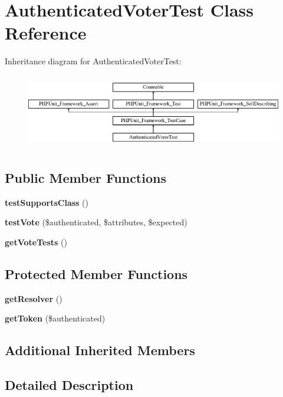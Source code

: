 \section{Authenticated\+Voter\+Test Class Reference}
\label{class_symfony_1_1_component_1_1_security_1_1_core_1_1_tests_1_1_authorization_1_1_voter_1_1_authenticated_voter_test}
Inheritance diagram for Authenticated\+Voter\+Test\+:\begin{figure}[H]
\begin{center}
\leavevmode
\includegraphics[height=3.303835cm]{class_symfony_1_1_component_1_1_security_1_1_core_1_1_tests_1_1_authorization_1_1_voter_1_1_authenticated_voter_test}
\end{center}
\end{figure}
\subsection*{Public Member Functions}
\begin{DoxyCompactItemize}
\item 
{\bf test\+Supports\+Class} ()
\item 
{\bf test\+Vote} (\$authenticated, \$attributes, \$expected)
\item 
{\bf get\+Vote\+Tests} ()
\end{DoxyCompactItemize}
\subsection*{Protected Member Functions}
\begin{DoxyCompactItemize}
\item 
{\bf get\+Resolver} ()
\item 
{\bf get\+Token} (\$authenticated)
\end{DoxyCompactItemize}
\subsection*{Additional Inherited Members}


\subsection{Detailed Description}


